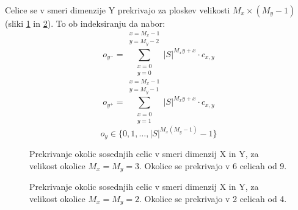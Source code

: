 \documentclass[12pt,a4paper,openany,twoside]{book}
\begin{document}
Celice se v smeri dimenzije Y prekrivajo za ploskev velikosti \(M_x \times (M_y-1)\) (sliki \ref{overlap_dimension_moore} in \ref{overlap_dimension_quad}).
To ob indeksiranju da nabor:
\begin{equation}
o_{y^-} = \sum_{\substack{x=0 \\ y=0}}^{\substack{x=M_x-1 \\ y=M_y-2}} |S|^{M_x y + x} \cdot c_{x,y}
\end{equation}
\begin{equation}
o_{y^+} = \sum_{\substack{x=0 \\ y=1}}^{\substack{x=M_x-1 \\ y=M_y-1}} |S|^{M_x y + x} \cdot c_{x,y}
\end{equation}
\begin{equation}
o_y \in \{0, 1, \dots, |S|^{M_x(M_y-1)}-1\}
\end{equation}

\begin{figure}[htb]
\centerline{}
\caption[Prekrivaje okolic \(3 \times 3\) v smeri dimenzij X in Y.]
{Prekrivanje okolic sosednjih celic v smeri dimenzij X in Y, za velikost okolice \(M_x=M_y=3\).
Okolice se prekrivajo v 6 celicah od 9.}
\label{overlap_dimension_moore}
\end{figure}

\begin{figure}[htb]
\centerline{}
\caption[Prekrivaje okolic \(2 \times 2\) v smeri dimenzij X in Y.]
{Prekrivanje okolic sosednjih celic v smeri dimenzij X in Y, za velikost okolice \(M_x=M_y=2\).
Okolice se prekrivajo v 2 celicah od 4.}
\label{overlap_dimension_quad}
\end{figure}
\end{document}
